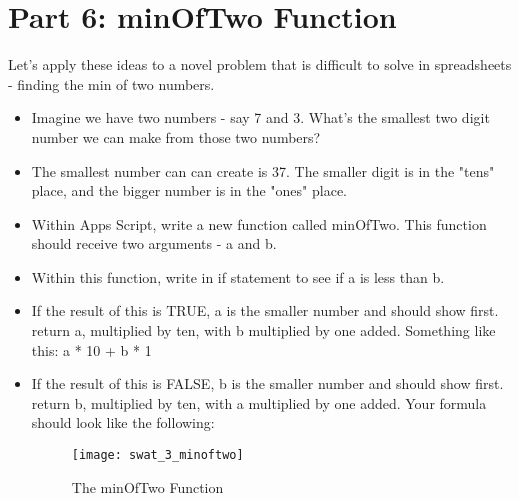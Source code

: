 \documentclass{article}
\begin{document}
\section*{Part 6: minOfTwo Function}
Let's apply these ideas to a novel problem that is difficult to solve in spreadsheets - finding the min of two numbers.
\begin{itemize}
	\item Imagine we have two numbers - say 7 and 3.  What's the smallest two digit number we can make from those two numbers?  
	\item The smallest number can can create is 37.  The smaller digit is in the "tens" place, and the bigger number is in the "ones" place.
	\item Within Apps Script, write a new function called minOfTwo.  This function should receive two arguments - a and b.
	\item Within this function, write in if statement to see if a is less than b.
	\item If the result of this is TRUE, a is the smaller number and should show first.  return a, multiplied by ten, with b multiplied by one added.  Something like this:  a * 10 + b * 1
	\item If the result of this is FALSE, b is the smaller number and should show first.  return b, multiplied by ten, with a multiplied by one added.  Your formula should look like the following:
	\begin{figure}[H]
  		\centering
  		\texttt{[image: swat\_3\_minoftwo]}
  		\caption{The minOfTwo Function}
	\end{figure}
\end{itemize}
\end{document}
